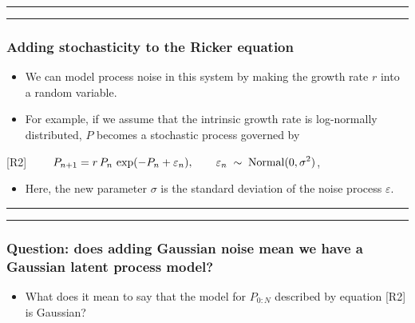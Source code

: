 \documentclass[]{article}
\providecommand{\tightlist}{%
  \setlength{\itemsep}{0pt}\setlength{\parskip}{0pt}}
\begin{document}
\begin{center}\rule{0.5\linewidth}{\linethickness}\end{center}

\begin{center}\rule{0.5\linewidth}{\linethickness}\end{center}

\subsubsection{Adding stochasticity to the Ricker
equation}\label{adding-stochasticity-to-the-ricker-equation}

\begin{itemize}
\item
  We can model process noise in this system by making the growth rate
  \(r\) into a random variable.
\item
  For example, if we assume that the intrinsic growth rate is
  log-normally distributed, \(P\) becomes a stochastic process governed
  by
\end{itemize}

{[}R2{]}
\(\quad\quad \displaystyle P_{n+1} = r\,P_{n}\,\exp(-P_{n}+\varepsilon_{n}), \qquad \varepsilon_{n}\;\sim\;\mathrm{Normal}(0,\sigma^2)\),

\begin{itemize}
\tightlist
\item
  Here, the new parameter \(\sigma\) is the standard deviation of the
  noise process \(\varepsilon\).
\end{itemize}

\begin{center}\rule{0.5\linewidth}{\linethickness}\end{center}

\begin{center}\rule{0.5\linewidth}{\linethickness}\end{center}

\subsubsection{Question: does adding Gaussian noise mean we have a
Gaussian latent process
model?}\label{question-does-adding-gaussian-noise-mean-we-have-a-gaussian-latent-process-model}

\begin{itemize}
\tightlist
\item
  What does it mean to say that the model for \(P_{0:N}\) described by
  equation {[}R2{]} is Gaussian?
\end{itemize}
\end{document}
